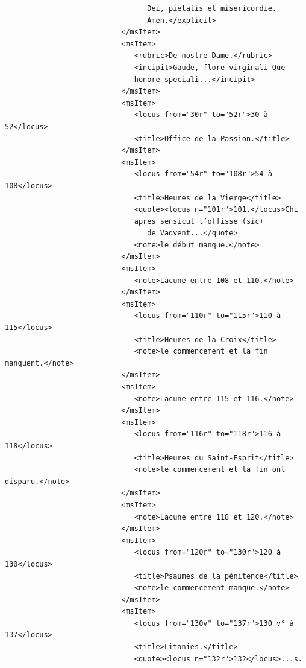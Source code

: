 \documentclass[a4paper,12pt,twoside]{book}
\begin{document}
\begin{verbatim}
                                 Dei, pietatis et misericordie.
                                 Amen.</explicit>
                           </msItem>
                           <msItem>
                              <rubric>De nostre Dame.</rubric>
                              <incipit>Gaude, flore virginali Que 
                              honore speciali...</incipit>
                           </msItem>
                           <msItem>
                              <locus from="30r" to="52r">30 à 52</locus>
                              <title>Office de la Passion.</title>
                           </msItem>
                           <msItem>
                              <locus from="54r" to="108r">54 à 108</locus>
                              <title>Heures de la Vierge</title>
                              <quote><locus n="101r">101.</locus>Chi 
                              apres sensicut l’offisse (sic)
                                 de Vadvent...</quote>
                              <note>le début manque.</note>
                           </msItem>
                           <msItem>
                              <note>Lacune entre 108 et 110.</note>
                           </msItem>
                           <msItem>
                              <locus from="110r" to="115r">110 à 115</locus>
                              <title>Heures de la Croix</title>
                              <note>le commencement et la fin manquent.</note>
                           </msItem>
                           <msItem>
                              <note>Lacune entre 115 et 116.</note>
                           </msItem>
                           <msItem>
                              <locus from="116r" to="118r">116 à 118</locus>
                              <title>Heures du Saint-Esprit</title>
                              <note>le commencement et la fin ont disparu.</note>
                           </msItem>
                           <msItem>
                              <note>Lacune entre 118 et 120.</note>
                           </msItem>
                           <msItem>
                              <locus from="120r" to="130r">120 à 130</locus>
                              <title>Psaumes de la pénitence</title>
                              <note>le commencement manque.</note>
                           </msItem>
                           <msItem>
                              <locus from="130v" to="137r">130 v° à 137</locus>
                              <title>Litanies.</title>
                              <quote><locus n="132r">132</locus>...s. 

\end{verbatim}
\end{document}
